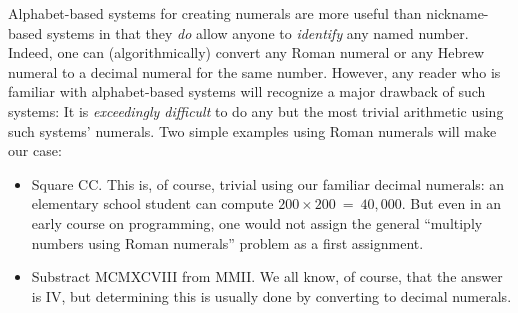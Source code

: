 Alphabet-based systems for creating numerals are more useful than
nickname-based systems in that they {\em do} allow anyone to {\em
  identify} any named number. Indeed, one can (algorithmically)
convert any Roman numeral or any Hebrew numeral to a decimal numeral
for the same number.  However, any reader who is familiar with
alphabet-based systems will recognize a major drawback of such
systems: It is {\em exceedingly difficult} to do any but the most
trivial arithmetic using such systems' numerals.  Two simple examples
using Roman numerals will make our case:
\begin{itemize}
\item
Square CC.  This is, of course, trivial using our familiar decimal
numerals: an elementary school student can compute $200 \times 200 \ =
\ 40,000$.  But even in an early course on programming, one would not
assign the general ``multiply numbers using Roman numerals'' problem
as a first assignment.

\item
Substract MCMXCVIII from MMII.  We all know, of course, that the answer
is IV, but determining this is usually done by converting to decimal numerals.
\end{itemize}

